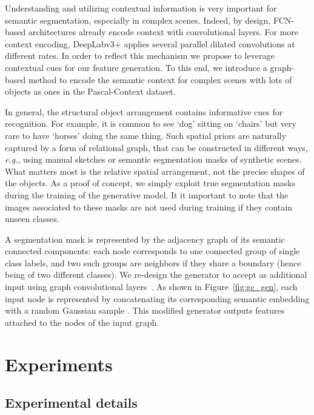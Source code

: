 \documentclass{article}
\begin{document}
Understanding and utilizing contextual information is very important for semantic segmentation, especially in complex scenes.
Indeed, by design, FCN-based architectures already encode context with convolutional layers.
For more context encoding, DeepLabv3+ applies several parallel dilated convolutions at different rates.
In order to reflect this mechanism we propose to leverage contextual cues for our feature generation.
To this end, we introduce a graph-based method to encode the semantic context for complex scenes with lots of objects as ones in the Pascal-Context dataset. 

In general, the structural object arrangement contains informative cues for recognition.
For example, it is common to see `dog' sitting on `chairs' but very rare to have `horses' doing the same thing. Such spatial priors are naturally captured by a form of relational graph, that can be constructed in different ways, \textit{e.g.}, using manual sketches or semantic segmentation masks of synthetic scenes. What matters most is the relative spatial arrangement, not the precise shapes of the objects. As a proof of concept, we simply exploit true segmentation masks during the training of the generative model. It it important to note that the images associated to these masks are not used during training if they contain unseen classes.      

A segmentation mask is represented by the adjacency graph  of its semantic connected components: each node corresponds to one connected group of single class labels, and two such groups are neighbors if they share a boundary (hence being of two different classes). 
We re-design the generator to accept  as additional input using graph convolutional layers~\cite{kipf2016semi}.
As shown in Figure~\ref{fig:gc_gen}, each input node  is represented by concatenating its corresponding semantic embedding  with a random Gaussian sample .
This modified generator outputs features attached to the nodes of the input graph.

 \section{Experiments}




\subsection{Experimental details}\label{sec:exp_detail}
\vspace{-0.3cm}
\end{document}
